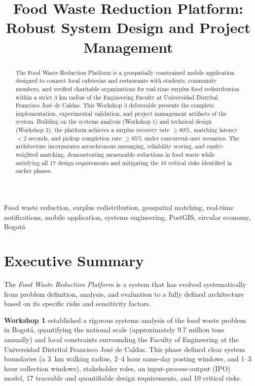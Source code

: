 \documentclass[9pt,conference]{IEEEtran}
\title{Food Waste Reduction Platform: Robust System Design and Project Management}
\author{
  \IEEEauthorblockN{\textbf{Luna Alejandra Sandoval Rodriguez}}
  \IEEEauthorblockA{20241020053 \\
                    \textit{Systems Analyst / Project Lead}}
  \and
  \IEEEauthorblockN{\textbf{Cristian Camilo Bonilla Lizarazo}}
  \IEEEauthorblockA{20241020015 \\
                    \textit{Systems Analyst / Frontend Developer}}
  \linebreakand
  \IEEEauthorblockN{\textbf{Nicolas Rodriguez Granados}}
  \IEEEauthorblockA{2024102037 \\
                    \textit{Systems Analyst / Backend Developer}}
  \and
  \IEEEauthorblockN{\textbf{Juan Sebastian Bravo Rojas}}
  \IEEEauthorblockA{20241020004 \\
                    \textit{Systems Analyst / Database Specialist}}
}
\begin{document}
\maketitle

\begin{abstract}
The Food Waste Reduction Platform is a geospatially constrained mobile application designed to connect local cafeterias and restaurants with students, community members, and verified charitable organizations for real-time surplus food redistribution within a strict 3 km radius of the Engineering Faculty at Universidad Distrital Francisco José de Caldas. This Workshop 3 deliverable presents the complete implementation, experimental validation, and project management artifacts of the system. Building on the systems analysis (Workshop 1) and technical design (Workshop 2), the platform achieves a surplus recovery rate $\geq 80\%$, matching latency $<2$ seconds, and pickup completion rate $\geq 85\%$ under concurrent-user scenarios. The architecture incorporates asynchronous messaging, reliability scoring, and equity-weighted matching, demonstrating measurable reductions in food waste while satisfying all 17 design requirements and mitigating the 10 critical risks identified in earlier phases.
\end{abstract}

\begin{IEEEkeywords}
Food waste reduction, surplus redistribution, geospatial matching, real-time notifications, mobile application, systems engineering, PostGIS, circular economy, Bogotá
\end{IEEEkeywords}

\section{Executive Summary}

The \textit{Food Waste Reduction Platform} is a system that has evolved systematically from problem definition, analysis, and evaluation to a fully defined architecture based on its specific risks and sensitivity factors.

\textbf{Workshop 1} established a rigorous systems analysis of the food waste problem in Bogotá, quantifying the national scale (approximately 9.7 million tons annually) and local constraints surrounding the Faculty of Engineering at the Universidad Distrital Francisco José de Caldas. This phase defined clear system boundaries (a 3~km walking radius, 2–4 hour same-day posting windows, and 1–3 hour collection windows), stakeholder roles, an input-process-output (IPO) model, 17 traceable and quantifiable design requirements, and 10 critical risks.
\end{document}
